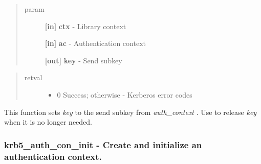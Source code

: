\documentclass[letterpaper,10pt,english]{sphinxmanual}
\begin{document}
\begin{fulllineitems}
\label{appdev/refs/api/krb5_auth_con_getsendsubkey_k:c.krb5_auth_con_getsendsubkey_k}
\end{fulllineitems}

\begin{quote}\begin{description}
\item[{param}] \leavevmode
\textbf{{[}in{]}} \textbf{ctx} - Library context

\textbf{{[}in{]}} \textbf{ac} - Authentication context

\textbf{{[}out{]}} \textbf{key} - Send subkey

\end{description}\end{quote}
\begin{quote}\begin{description}
\item[{retval}] \leavevmode\begin{itemize}
\item {} 
0   Success; otherwise - Kerberos error codes

\end{itemize}

\end{description}\end{quote}

This function sets \emph{key} to the send subkey from \emph{auth\_context} . Use {\hyperref[appdev/refs/api/krb5_k_free_key:c.krb5_k_free_key]{}} to release \emph{key} when it is no longer needed.


\subsubsection{krb5\_auth\_con\_init -  Create and initialize an authentication context.}
\label{appdev/refs/api/krb5_auth_con_init:krb5-auth-con-init-create-and-initialize-an-authentication-context}\label{appdev/refs/api/krb5_auth_con_init::doc}
\end{document}
